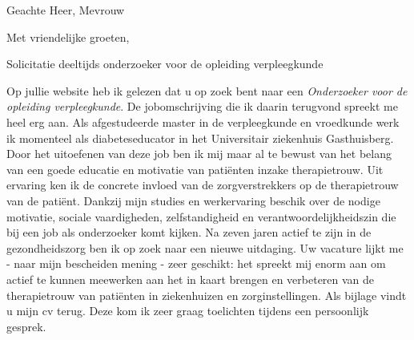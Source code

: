 \documentclass[11pt,a4paper,sans]{moderncv} %
\begin{document}

\clearpage

\date{\today} %
\opening{Geachte Heer, Mevrouw} %
\closing{Met vriendelijke groeten,} %

\makelettertitle %

Solicitatie deeltijds onderzoeker voor de opleiding verpleegkunde\newline

Op jullie website heb ik gelezen dat u op zoek bent naar een \textit{Onderzoeker voor de opleiding verpleegkunde}. \newline
De jobomschrijving die ik daarin terugvond spreekt me heel erg aan. Als afgestudeerde master in de verpleegkunde en vroedkunde werk ik momenteel als diabeteseducator in het Universitair ziekenhuis Gasthuisberg. Door het uitoefenen van deze job ben ik mij maar al te bewust van het belang van een goede educatie en motivatie van pati\"{e}nten inzake therapietrouw. Uit ervaring ken ik de concrete invloed van de zorgverstrekkers op de therapietrouw van de pati\"{e}nt.
Dankzij mijn studies en werkervaring beschik over de nodige motivatie, sociale vaardigheden, zelfstandigheid en verantwoordelijkheidszin die bij een job als onderzoeker komt kijken.\newline
Na zeven jaren actief te zijn in de gezondheidszorg ben ik op zoek naar een nieuwe uitdaging. Uw vacature lijkt me - naar mijn bescheiden mening - zeer geschikt: het spreekt mij enorm aan om actief te kunnen meewerken aan het in kaart brengen en verbeteren van de therapietrouw van pati\"{e}nten in ziekenhuizen en zorginstellingen. \newline \newline
Als bijlage vindt u mijn cv terug. Deze kom ik zeer graag toelichten tijdens een persoonlijk gesprek.\newline\newline


\makeletterclosing %

\end{document}
